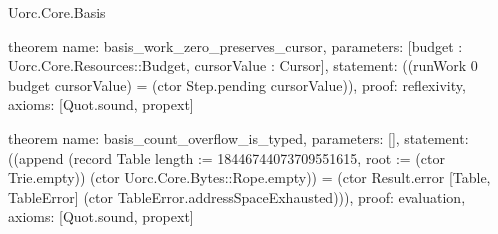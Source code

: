 \begin{lexlean}{Uorc.Core.Basis}
\begin{semanticmodule}
theorem{
  name: basis_work_zero_preserves_cursor,
  parameters: [budget : Uorc.Core.Resources::Budget, cursorValue : Cursor],
  statement: ((runWork 0 budget cursorValue) = (ctor Step.pending cursorValue)),
  proof: reflexivity{},
  axioms: [Quot.sound, propext]
}

theorem{
  name: basis_count_overflow_is_typed,
  parameters: [],
  statement: ((append (record Table {length := 18446744073709551615, root := (ctor Trie.empty)}) (ctor Uorc.Core.Bytes::Rope.empty)) = (ctor Result.error [Table, TableError] (ctor TableError.addressSpaceExhausted))),
  proof: evaluation{},
  axioms: [Quot.sound, propext]
}
\end{semanticmodule}
\end{lexlean}
